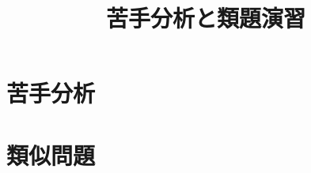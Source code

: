 \documentclass[a4paper,11pt]{jlreq}
\title{苦手分析と類題演習}
\author{}
\date{}
\begin{document}
\maketitle

\section*{苦手分析}


\newpage

\section*{類似問題}

\end{document}
